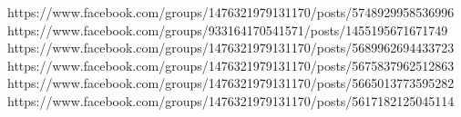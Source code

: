  
 
 
 
 

https://www.facebook.com/groups/1476321979131170/posts/5748929958536996
https://www.facebook.com/groups/933164170541571/posts/1455195671671749
https://www.facebook.com/groups/1476321979131170/posts/5689962694433723
https://www.facebook.com/groups/1476321979131170/posts/5675837962512863
https://www.facebook.com/groups/1476321979131170/posts/5665013773595282
https://www.facebook.com/groups/1476321979131170/posts/5617182125045114
